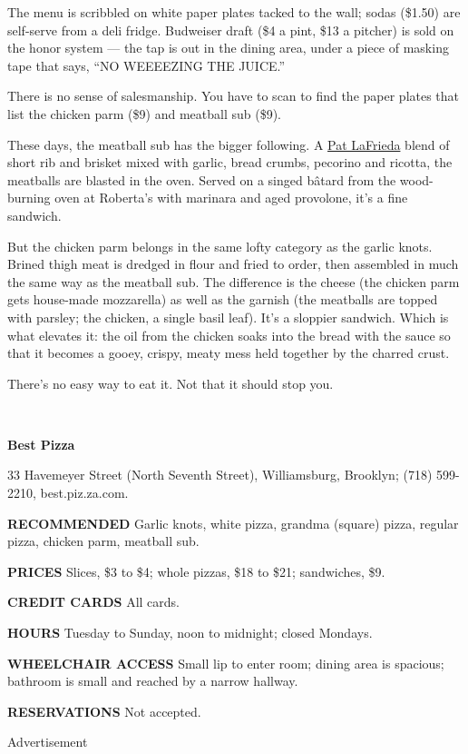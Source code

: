 The menu is scribbled on white paper plates tacked to the wall; sodas
(\$1.50) are self-serve from a deli fridge. Budweiser draft (\$4 a pint,
\$13 a pitcher) is sold on the honor system --- the tap is out in the
dining area, under a piece of masking tape that says, ``NO WEEEEZING THE
JUICE.''

There is no sense of salesmanship. You have to scan to find the paper
plates that list the chicken parm (\$9) and meatball sub (\$9).

These days, the meatball sub has the bigger following. A
\href{http://lafrieda.com/}{Pat LaFrieda} blend of short rib and brisket
mixed with garlic, bread crumbs, pecorino and ricotta, the meatballs are
blasted in the oven. Served on a singed bâtard from the wood-burning
oven at Roberta's with marinara and aged provolone, it's a fine
sandwich.

But the chicken parm belongs in the same lofty category as the garlic
knots. Brined thigh meat is dredged in flour and fried to order, then
assembled in much the same way as the meatball sub. The difference is
the cheese (the chicken parm gets house-made mozzarella) as well as the
garnish (the meatballs are topped with parsley; the chicken, a single
basil leaf). It's a sloppier sandwich. Which is what elevates it: the
oil from the chicken soaks into the bread with the sauce so that it
becomes a gooey, crispy, meaty mess held together by the charred crust.

There's no easy way to eat it. Not that it should stop you.

~

\textbf{Best Pizza}

33 Havemeyer Street (North Seventh Street), Williamsburg, Brooklyn;
(718) 599-2210, best.piz.za.com.

\textbf{RECOMMENDED} Garlic knots, white pizza, grandma (square) pizza,
regular pizza, chicken parm, meatball sub.

\textbf{PRICES} Slices, \$3 to \$4; whole pizzas, \$18 to \$21;
sandwiches, \$9.

\textbf{CREDIT CARDS} All cards.

\textbf{HOURS} Tuesday to Sunday, noon to midnight; closed Mondays.

\textbf{WHEELCHAIR ACCESS} Small lip to enter room; dining area is
spacious; bathroom is small and reached by a narrow hallway.

\textbf{RESERVATIONS} Not accepted.

Advertisement


